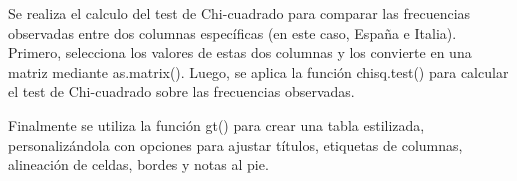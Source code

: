 \documentclass[
]{article}
\newenvironment{Shaded}{\begin{snugshade}}{\end{snugshade}}
\newcommand{\AttributeTok}[1]{\textcolor[rgb]{0.13,0.29,0.53}{#1}}
\newcommand{\CommentTok}[1]{\textcolor[rgb]{0.56,0.35,0.01}{\textit{#1}}}
\newcommand{\DecValTok}[1]{\textcolor[rgb]{0.00,0.00,0.81}{#1}}
\newcommand{\FloatTok}[1]{\textcolor[rgb]{0.00,0.00,0.81}{#1}}
\newcommand{\FunctionTok}[1]{\textcolor[rgb]{0.13,0.29,0.53}{\textbf{#1}}}
\newcommand{\NormalTok}[1]{#1}
\newcommand{\OtherTok}[1]{\textcolor[rgb]{0.56,0.35,0.01}{#1}}
\newcommand{\SpecialCharTok}[1]{\textcolor[rgb]{0.81,0.36,0.00}{\textbf{#1}}}
\newcommand{\StringTok}[1]{\textcolor[rgb]{0.31,0.60,0.02}{#1}}
\begin{document}
Se realiza el calculo del test de Chi-cuadrado para comparar las
frecuencias observadas entre dos columnas específicas (en este caso,
España e Italia). Primero, selecciona los valores de estas dos columnas
y los convierte en una matriz mediante as.matrix(). Luego, se aplica la
función chisq.test() para calcular el test de Chi-cuadrado sobre las
frecuencias observadas.

\begin{Shaded}
\end{Shaded}

Finalmente se utiliza la función gt() para crear una tabla estilizada,
personalizándola con opciones para ajustar títulos, etiquetas de
columnas, alineación de celdas, bordes y notas al pie.
\end{document}
